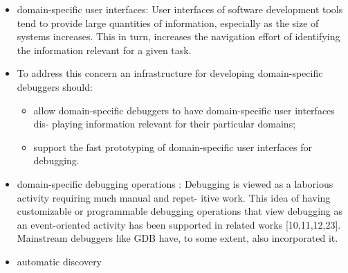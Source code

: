\begin{itemize}
	\item domain-specific user interfaces: User interfaces of software development tools tend to provide large quantities of information, especially as the size of systems increases. This in turn, increases the navigation effort of identifying the information relevant for a given task.
	\item To address this concern an infrastructure for developing domain-specific debuggers should:
	\begin{itemize}
		\item allow domain-specific debuggers to have domain-specific user interfaces dis- playing information relevant for their particular domains;
		\item support the fast prototyping of domain-specific user interfaces for debugging.
	\end{itemize}
	\item domain-specific debugging operations : Debugging is viewed as a laborious activity requiring much manual and repet- itive work. This idea of having customizable or programmable debugging operations that view debugging as an event-oriented activity has been supported in related works [10,11,12,23]. Mainstream debuggers like GDB have, to some extent, also incorporated it.

	\item automatic discovery


\end{itemize}
